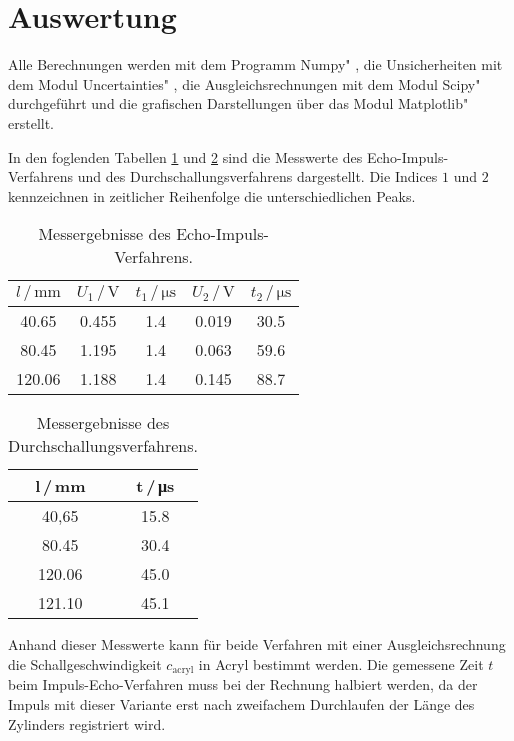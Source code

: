 \section{Auswertung}
\label{sec:Auswertung}
Alle Berechnungen werden mit dem Programm \glqq Numpy" \cite{numpy}, die Unsicherheiten mit dem Modul \glqq Uncertainties" \cite{uncertainties}, die Ausgleichsrechnungen mit dem Modul \glqq Scipy" \cite{scipy} durchgeführt und die grafischen Darstellungen über das Modul \glqq Matplotlib" \cite{matplotlib} erstellt.

In den foglenden Tabellen \ref{tab:impulsecho} und \ref{tab:durchschallung} sind die Messwerte des Echo-Impuls-Verfahrens und 
des Durchschallungsverfahrens dargestellt. Die Indices $1$ und $2$ kennzeichnen in zeitlicher Reihenfolge die unterschiedlichen Peaks.

\begin{table}
    \centering
    \caption{Messergebnisse des Echo-Impuls-Verfahrens.}
    \begin{tabular}{c c c c c}
        \toprule
        $l\,/\,\si{\milli\metre}$ & $U_1\,/\,\si{\volt}$ & $t_1\,/\,\si{\micro\second}$ & $U_2\,/\,\si{\volt}$ & $t_2\,/\,\si{\micro\second}$  \\
        \midrule
          40.65 & 0.455 &  1.4 & 0.019 & 30.5 \\
          80.45 & 1.195 &  1.4 & 0.063 & 59.6 \\
         120.06 & 1.188 &  1.4 & 0.145 & 88.7 \\
        \bottomrule
    \end{tabular}
    \label{tab:impulsecho}
\end{table}

\begin{table}
    \centering
    \caption{Messergebnisse des Durchschallungsverfahrens.}
    \begin{tabular}{c c}
        \toprule
        l\,/\,\si{\milli\metre} & t\,/\,\si{\micro\second} \\
        \midrule
         40,65 & 15.8 \\
         80.45 & 30.4 \\
        120.06 & 45.0 \\
        121.10 & 45.1 \\
        \bottomrule
    \end{tabular}
    \label{tab:durchschallung}
\end{table}

Anhand dieser Messwerte kann für beide Verfahren mit einer Ausgleichsrechnung die Schallgeschwindigkeit $c_\text{acryl}$ in Acryl bestimmt werden.
Die gemessene Zeit $t$ beim Impuls-Echo-Verfahren muss bei der Rechnung halbiert werden, da der Impuls mit dieser Variante erst 
nach zweifachem Durchlaufen der Länge des Zylinders registriert wird.


